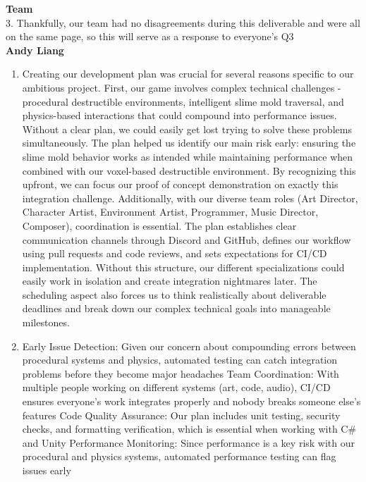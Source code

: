 \textbf{Team}\\
3. Thankfully, our team had no disagreements during this deliverable and were all on the same page, so this will serve as a response to everyone's Q3\\


\textbf{Andy Liang}
\begin{enumerate}
\item{Creating our development plan was crucial for several reasons specific to our ambitious project. First, our game involves complex technical challenges - procedural destructible environments, intelligent slime mold traversal, and physics-based interactions that could compound into performance issues. Without a clear plan, we could easily get lost trying to solve these problems simultaneously. The plan helped us identify our main risk early: ensuring the slime mold behavior works as intended while maintaining performance when combined with our voxel-based destructible environment. By recognizing this upfront, we can focus our proof of concept demonstration on exactly this integration challenge. Additionally, with our diverse team roles (Art Director, Character Artist, Environment Artist, Programmer, Music Director, Composer), coordination is essential. The plan establishes clear communication channels through Discord and GitHub, defines our workflow using pull requests and code reviews, and sets expectations for CI/CD implementation. Without this structure, our different specializations could easily work in isolation and create integration nightmares later. The scheduling aspect also forces us to think realistically about deliverable deadlines and break down our complex technical goals into manageable milestones. }
\item{Early Issue Detection: Given our concern about compounding errors between procedural systems and physics, automated testing can catch integration problems before they become major headaches
Team Coordination: With multiple people working on different systems (art, code, audio), CI/CD ensures everyone's work integrates properly and nobody breaks someone else's features
Code Quality Assurance: Our plan includes unit testing, security checks, and formatting verification, which is essential when working with C\# and Unity
Performance Monitoring: Since performance is a key risk with our procedural and physics systems, automated performance testing can flag issues early}
\end{enumerate}

